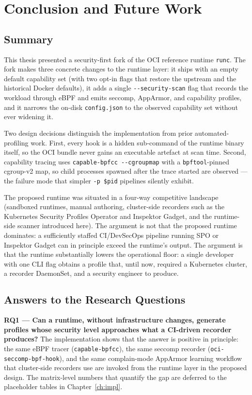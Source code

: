 
\chapter{Conclusion and Future Work}\label{ch:conclusion}

\section{Summary}

This thesis presented a security-first fork of the OCI reference runtime \texttt{runc}. The fork makes three concrete changes to the runtime layer: it ships with an empty default capability set (with two opt-in flags that restore the upstream and the historical Docker defaults), it adds a single \texttt{-{}-security-scan} flag that records the workload through eBPF and emits seccomp, AppArmor, and capability profiles, and it narrows the on-disk \texttt{config.json} to the observed capability set without ever widening it.

Two design decisions distinguish the implementation from prior automated-profiling work. First, every hook is a hidden sub-command of the runtime binary itself, so the OCI bundle never gains an executable artefact at scan time. Second, capability tracing uses \texttt{capable-bpfcc -{}-cgroupmap} with a \texttt{bpftool}-pinned cgroup-v2 map, so child processes spawned after the trace started are observed --- the failure mode that simpler \texttt{-p \$pid} pipelines silently exhibit.

The proposed runtime was situated in a four-way competitive landscape (sandboxed runtimes, manual authoring, cluster-side recorders such as the Kubernetes Security Profiles Operator and Inspektor Gadget, and the runtime-side scanner introduced here). The argument is not that the proposed runtime dominates: a sufficiently staffed CI/DevSecOps pipeline running SPO or Inspektor Gadget can in principle exceed the runtime's output. The argument is that the runtime substantially lowers the operational floor: a single developer with one CLI flag obtains a profile that, until now, required a Kubernetes cluster, a recorder DaemonSet, and a security engineer to produce.

\section{Answers to the Research Questions}

\textbf{RQ1 --- Can a runtime, without infrastructure changes, generate profiles whose security level approaches what a CI-driven recorder produces?} The implementation shows that the answer is positive in principle: the same eBPF tracer (\texttt{capable-bpfcc}), the same seccomp recorder (\texttt{oci-seccomp-bpf-hook}), and the same complain-mode AppArmor learning workflow that cluster-side recorders use are invoked from the runtime layer in the proposed design. The matrix-level numbers that quantify the gap are deferred to the placeholder tables in Chapter~\ref{ch:impl}.

